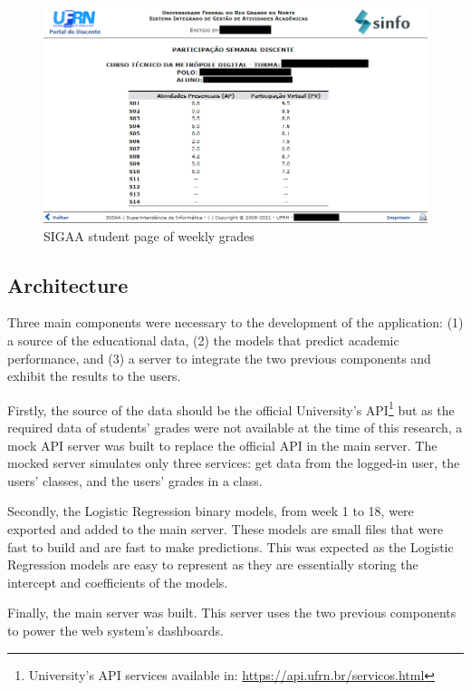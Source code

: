 \begin{figure}[htb]
	\centering
  	\includegraphics[scale=.7]{Resultados/sigaa_aluno.png}
  	\caption{SIGAA student page of weekly grades}
  	\label{fig:sigaa_aluno}
\end{figure}

\subsection{Architecture}

Three main components were necessary to the development of the application: (1) a source of the educational data, (2) the models that predict academic performance, and (3) a server to integrate the two previous components and exhibit the results to the users.

Firstly, the source of the data should be the official University's API\footnote[1]{\hspace{1mm}University's API services available in: \url{https://api.ufrn.br/servicos.html}} but as the required data of students' grades were not available at the time of this research, a mock API server was built to replace the official API in the main server. The mocked server simulates only three services: get data from the logged-in user, the users' classes, and the users' grades in a class.

Secondly, the Logistic Regression binary models, from week 1 to 18, were exported and added to the main server. These models are small files that were fast to build and are fast to make predictions. This was expected as the Logistic Regression models are easy to represent as they are essentially storing the intercept and coefficients of the models.

Finally, the main server was built. This server uses the two previous components to power the web system's dashboards.


